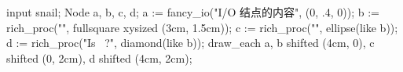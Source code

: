 \usemodule[zhfonts]
\startMPpage
input snail;
Node a, b, c, d;
a := fancy_io("I/O 结点的内容", (0, .4, 0));
b := rich_proc("\CONTEXT", fullsquare xysized (3cm, 1.5cm));
c := rich_proc("\METAPOST", ellipse(like b));
d := rich_proc("Is \LUATEX\ ?", diamond(like b));
draw_each a, b shifted (4cm, 0), c shifted (0, 2cm), d shifted (4cm, 2cm);
\stopMPpage
